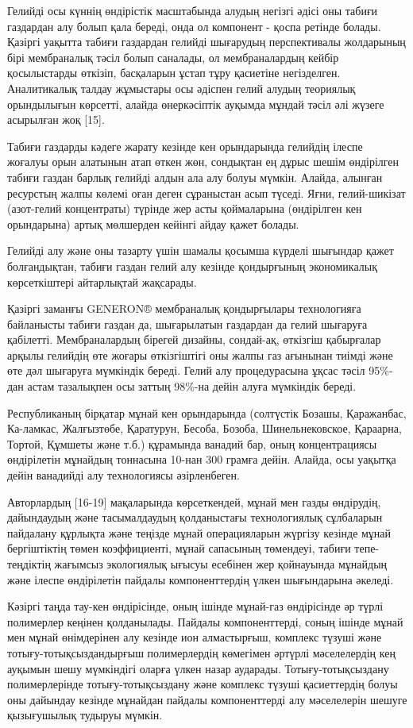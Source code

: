 \begin{multicols}{2}
Гелийді осы күннің өндірістік масштабында алудың негізгі әдісі оны
табиғи газдардан алу болып қала береді, онда ол компонент - қоспа
ретінде болады. Қазіргі уақытта табиғи газдардан гелийді шығарудың
перспективалы жолдарының бірі мембраналық тәсіл болып саналады, ол
мембраналардың кейбір қосылыстарды өткізіп, басқаларын ұстап тұру
қасиетіне негізделген. Аналитикалық талдау жұмыстары осы әдіспен гелий
алудың теориялық орындылығын көрсетті, алайда өнеркәсіптік ауқымда
мұндай тәсіл әлі жүзеге асырылған жоқ {[}15{]}.

Табиғи газдарды кәдеге жарату кезінде кен орындарында гелийдің ілеспе
жоғалуы орын алатынын атап өткен жөн, сондықтан ең дұрыс шешім
өндірілген табиғи газдан барлық гелийді алдын ала алу болуы мүмкін.
Алайда, алынған ресурстың жалпы көлемі оған деген сұраныстан асып
түседі. Яғни, гелий-шикізат (азот-гелий концентраты) түрінде жер асты
қоймаларына (өндірілген кен орындарына) артық мөлшерден кейінгі айдау
қажет болады.

Гелийді алу және оны тазарту үшін шамалы қосымша күрделі шығындар қажет
болғандықтан, табиғи газдан гелий алу кезінде қондырғының экономикалық
көрсеткіштері айтарлықтай жақсарады.

Қазіргі заманғы GENERON® мембраналық қондырғылары технологияға
байланысты табиғи газдан да, шығарылатын газдардан да гелий шығаруға
қабілетті. Мембраналардың бірегей дизайны, сондай-ақ, өткізгіш
қабырғалар арқылы гелийдің өте жоғары өткізгіштігі оны жалпы газ
ағынынан тиімді және өте дәл шығаруға мүмкіндік береді. Гелий алу
процедурасына ұқсас тәсіл 95\%-дан астам тазалықпен осы заттың 98\%-на
дейін алуға мүмкіндік береді.

Республиканың бірқатар мұнай кен орындарында (солтүстік Бозашы,
Қаражанбас, Ка-ламкас, Жалғызтөбе, Қаратурун, Бесоба, Бозоба,
Шинельнековское, Қараарна, Тортой, Құмшеты және т.б.) құрамында ванадий
бар, оның концентрациясы өндірілетін мұнайдың тоннасына 10-нан 300
грамға дейін. Алайда, осы уақытқа дейін ванадийді алу технологиясы
әзірленбеген.

Авторлардың {[}16-19{]} мақаларында көрсеткендей, мұнай мен газды
өндірудің, дайындаудың және тасымалдаудың қолданыстағы технологиялық
сұлбаларын пайдалану құрлықта және теңізде мұнай операцияларын жүргізу
кезінде мұнай бергіштіктің төмен коэффициенті, мұнай сапасының
төмендеуі, табиғи тепе-теңдіктің жағымсыз экологиялық ығысуы есебінен
жер қойнауында мұнайдың және ілеспе өндірілетін пайдалы компоненттердің
үлкен шығындарына әкеледі.

Кәзіргі таңда тау-кен өндірісінде, оның ішінде мұнай-газ өндірісінде әр
түрлі полимерлер кеңінен қолданылады. Пайдалы компоненттерді, соның
ішінде мұнай мен мұнай өнімдерінен алу кезінде ион алмастырғыш, комплекс
түзуші және тотығу-тотықсыздандырғыш полимерлердің көмегімен әртүрлі
мәселелердің кең ауқымын шешу мүмкіндігі оларға үлкен назар аударады.
Тотығу-тотықсыздану полимерлерінде тотығу-тотықсыздану және комплекс
түзуші қасиеттердің болуы оны дайындау кезінде мұнайдан пайдалы
компоненттерді алу мәселелерін шешуге қызығушылық тудыруы мүмкін.


\end{multicols}
